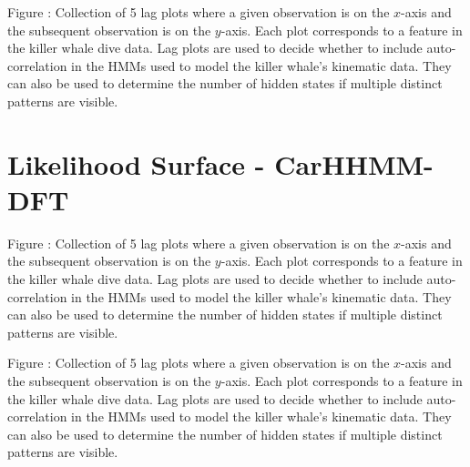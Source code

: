 \documentclass{article}
\begin{document}
        \noindent Figure : Collection of 5 lag plots where a given observation is on the $x$-axis and the subsequent observation is on the $y$-axis. Each plot corresponds to a feature in the killer whale dive data. Lag plots are used to decide whether to include auto-correlation in the HMMs used to model the killer whale's kinematic data. They can also be used to determine the number of hidden states if multiple distinct patterns are visible. 
        \addtocounter{fignum}{1}
        
        \newpage
        
    \section{Likelihood Surface - CarHHMM-DFT}
    
        \begin{center}
        \end{center}
        
        \noindent Figure : Collection of 5 lag plots where a given observation is on the $x$-axis and the subsequent observation is on the $y$-axis. Each plot corresponds to a feature in the killer whale dive data. Lag plots are used to decide whether to include auto-correlation in the HMMs used to model the killer whale's kinematic data. They can also be used to determine the number of hidden states if multiple distinct patterns are visible. 
        \addtocounter{fignum}{1}
        
        
        \begin{center}
        \end{center}
        
        \noindent Figure : Collection of 5 lag plots where a given observation is on the $x$-axis and the subsequent observation is on the $y$-axis. Each plot corresponds to a feature in the killer whale dive data. Lag plots are used to decide whether to include auto-correlation in the HMMs used to model the killer whale's kinematic data. They can also be used to determine the number of hidden states if multiple distinct patterns are visible. 
        \addtocounter{fignum}{1}
        
\end{document}
